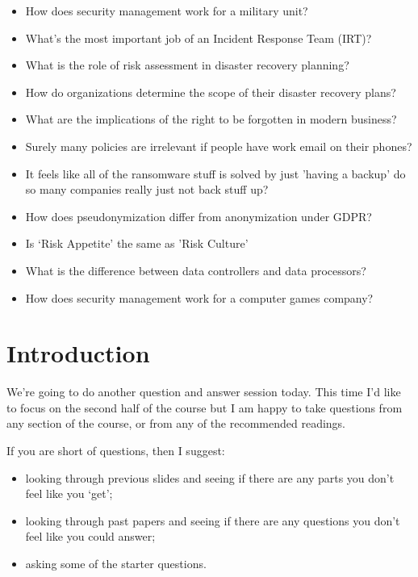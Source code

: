 \documentclass[12pt]{article}
\begin{document}
\begin{itemize}
  \item How does security management work for a military unit?
  \item What's the most important job of an Incident Response Team (IRT)?
  \item What is the role of risk assessment in disaster recovery planning?
  \item How do organizations determine the scope of their disaster recovery plans?
  \item What are the implications of the right to be forgotten in modern business?
  \item Surely many policies are irrelevant if people have work email on their phones?
  \item It feels like all of the ransomware stuff is solved by just 'having a backup' do so many companies really just not back stuff up?
  \item How does pseudonymization differ from anonymization under GDPR?
  \item Is `Risk Appetite' the same as 'Risk Culture'
  \item What is the difference between data controllers and data processors?
  \item How does security management work for a computer games company?
\end{itemize}


%
%



\maketitle

\section*{Introduction}
We're going to do another question and answer session today. This time I'd like to focus on the second half of the course but I am happy to take questions from any section of the course, or from any of the recommended readings. 

If you are short of questions, then I suggest: 

\begin{itemize} 
\item looking through previous slides and seeing if there are any parts you don't feel like you `get';
\item looking through past papers and seeing if there are any questions you don't feel like you could answer;
\item asking some of the starter questions.
\end{itemize} 
\end{document}

